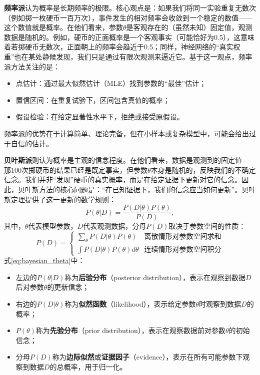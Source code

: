 \textbf{频率派}认为概率是长期频率的极限。核心观点是：如果我们将同一实验重复无数次（例如掷一枚硬币一百万次），事件发生的相对频率会收敛到一个稳定的数值——这个数值就是概率。在他们看来，参数$\theta$是客观存在的（虽然未知）固定值，观测数据是随机的。例如，硬币的正面概率是一个客观事实（可能恰好为0.5），这意味着若掷硬币无数次，正面朝上的频率会趋近于0.5；同样，神经网络的``真实权重''也在某处静候发现，我们只是通过有限次观测来逼近它。基于这一观点，频率派方法关注的是：
\begin{itemize}
  \item 点估计：通过最大似然估计（MLE）找到参数的``最佳''估计；
  \item 置信区间：在重复试验下，区间包含真值的概率；
  \item 假设检验：在给定显著性水平下，拒绝或接受原假设。
\end{itemize}
频率派的优势在于计算简单、理论完备，但在小样本或复杂模型中，可能会给出过于自信的估计。

\textbf{贝叶斯派}则认为概率是主观的信念程度。在他们看来，数据是观测到的固定值——那100次掷硬币的结果已经是既定事实，但参数$\theta$本身是随机的，反映我们的不确定信念。我们并非``发现''硬币的真实概率，而是在给定证据下更新对它的信念。因此，贝叶斯方法的核心问题是：``在已知证据下，我们的信念应当如何更新''。贝叶斯定理提供了这一更新的数学规则：
\begin{equation}\label{eq:bayesian_theta}
P(\theta|D) = \frac{P(D|\theta)P(\theta)}{P(D)},
\end{equation}
其中，$\theta$代表模型参数，$D$代表观测数据，分母$P(D)$取决于参数空间的性质：
$$
P(D)=\left\{\begin{array}{ll}  \sum_{\theta} P(D|\theta)P(\theta) & \mbox{离散情形对参数空间求和}\\
  \int P(D|\theta)P(\theta)d\theta &\mbox{连续情形对参数空间积分}
\end{array}\right.
$$
式\eqref{eq:bayesian_theta}中：
\begin{itemize}
  \item 左边的$P(\theta|D)$称为\textbf{后验分布}（posterior distribution），表示在观察到数据$D$后对参数$\theta$的更新信念；
  \item 右边的$P(D|\theta)$称为\textbf{似然函数}（likelihood），表示给定参数$\theta$时观察到数据$D$的概率；
  \item $P(\theta)$称为\textbf{先验分布}（prior distribution），表示在观察数据前对参数$\theta$的初始信念；
  \item 分母$P(D)$称为\textbf{边际似然}或\textbf{证据因子}（evidence），表示在所有可能参数下观察到数据$D$的总概率，用于归一化。
\end{itemize}

